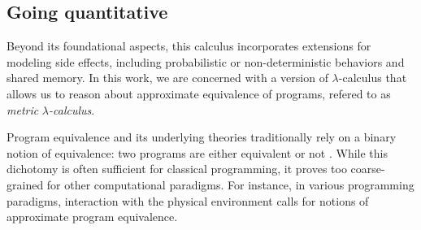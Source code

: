 




\subsection*{Going quantitative}

Beyond its foundational aspects, this calculus incorporates extensions for modeling side effects, including probabilistic or non-deterministic behaviors and shared memory. In this work, we are concerned with a version of $\lambda$-calculus that allows us to reason about approximate equivalence of programs, refered to as \emph{metric }$\lambda$\emph{-calculus}.

Program equivalence and its underlying theories traditionally rely on a binary notion of equivalence: two programs are either equivalent or not \cite{winskel93}. While this dichotomy is often sufficient for classical programming, it proves too coarse-grained for other computational paradigms. For instance, in various programming paradigms, interaction with the physical environment calls for notions of approximate program equivalence. 

